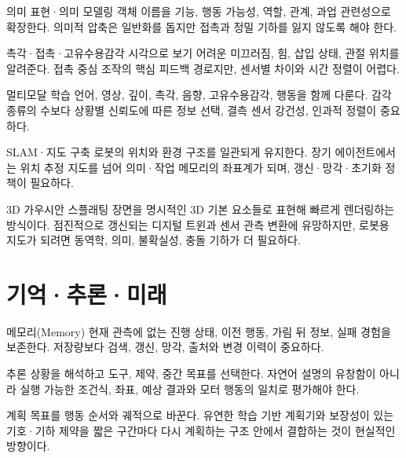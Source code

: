 \documentclass[11pt,openany]{book}
\begin{document}
\begin{termcard}{의미 표현·의미 모델링}
객체 이름을 기능, 행동 가능성, 역할, 관계, 과업 관련성으로 확장한다. 의미적 압축은 일반화를 돕지만 접촉과 정밀 기하를 잃지 않도록 해야 한다.
\end{termcard}

\begin{termcard}{촉각·접촉·고유수용감각}
시각으로 보기 어려운 미끄러짐, 힘, 삽입 상태, 관절 위치를 알려준다. 접촉 중심 조작의 핵심 피드백 경로지만, 센서별 차이와 시간 정렬이 어렵다.
\end{termcard}

\begin{termcard}{멀티모달 학습}
언어, 영상, 깊이, 촉각, 음향, 고유수용감각, 행동을 함께 다룬다. 감각 종류의 수보다 상황별 신뢰도에 따른 정보 선택, 결측 센서 강건성, 인과적 정렬이 중요하다.
\end{termcard}

\begin{termcard}{SLAM·지도 구축}
로봇의 위치와 환경 구조를 일관되게 유지한다. 장기 에이전트에서는 위치 추정 지도를 넘어 의미·작업 메모리의 좌표계가 되며, 갱신·망각·초기화 정책이 필요하다.
\end{termcard}

\begin{termcard}{3D 가우시안 스플래팅}
장면을 명시적인 3D 기본 요소들로 표현해 빠르게 렌더링하는 방식이다. 점진적으로 갱신되는 디지털 트윈과 센서 관측 변환에 유망하지만, 로봇용 지도가 되려면 동역학, 의미, 불확실성, 충돌 기하가 더 필요하다.
\end{termcard}

\chapter*{기억·추론·미래}

\begin{termcard}{메모리(Memory)}
현재 관측에 없는 진행 상태, 이전 행동, 가림 뒤 정보, 실패 경험을 보존한다. 저장량보다 검색, 갱신, 망각, 출처와 변경 이력이 중요하다.
\end{termcard}

\begin{termcard}{추론}
상황을 해석하고 도구, 제약, 중간 목표를 선택한다. 자연어 설명의 유창함이 아니라 실행 가능한 조건식, 좌표, 예상 결과와 모터 행동의 일치로 평가해야 한다.
\end{termcard}

\begin{termcard}{계획}
목표를 행동 순서와 궤적으로 바꾼다. 유연한 학습 기반 계획기와 보장성이 있는 기호·기하 제약을 짧은 구간마다 다시 계획하는 구조 안에서 결합하는 것이 현실적인 방향이다.
\end{termcard}
\end{document}
